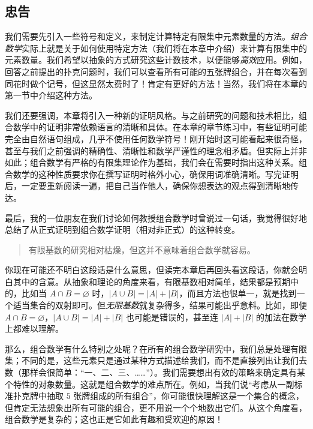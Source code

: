 
\subsection{忠告}

我们需要先引入一些符号和定义，来制定计算特定有限集中元素数量的方法。\emph{组合数学}实际上就是关于如何使用特定方法（我们将在本章中介绍）来计算有限集中的元素数量。我们希望以抽象的方式研究这些计数技术，以便能够\emph{高效}应用。例如，回答之前提出的扑克问题时，我们可以查看所有可能的五张牌组合，并在每次看到同花时做个记号，但这显然太费时了！肯定有更好的方法！当然，我们将在本章的第一节中介绍这种方法。

我们还要强调，本章将引入一种新的证明风格。与之前研究的问题和技术相比，组合数学中的证明非常依赖语言的清晰和具体。在本章的章节练习中，有些证明可能完全由自然语句组成，几乎不使用任何数学符号！刚开始时这可能看起来很奇怪，甚至与我们之前强调的精确性、清晰性和数学严谨性的理念相矛盾。但实际上并非如此；组合数学有严格的有限集理论作为基础，我们会在需要时指出这种关系。组合数学的这种性质要求你在撰写证明时格外小心，确保用词准确清晰。写完证明后，一定要重新阅读一遍，把自己当作他人，确保你想表达的观点得到清晰地传达。

最后，我的一位朋友在我们讨论如何教授组合数学时曾说过一句话，我觉得很好地总结了从正式证明到组合数学证明（相对非正式）的这种转变。
\begin{quotation}
    有限基数的研究相对枯燥，但这并不意味着组合数学就容易。
\end{quotation}
你现在可能还不明白这段话是什么意思，但读完本章后再回头看这段话，你就会明白其中的含意。从抽象和理论的角度来看，有限基数相对简单，结果都是预期中的，比如当 $A \cap B = \varnothing$ 时，$|A \cup B| = |A|+|B|$，而且方法也很单一，就是找到一个适当集合的双射即可。但\emph{无限基数}就复杂得多，结果可能出乎意料。比如，即便 $A \cap B = \varnothing$，$|A \cup B| = |A|+|B|$ 也可能是错误的，甚至连 $|A|+|B|$ 的加法在数学上都难以理解。

那么，组合数学有什么特别之处呢？在所有的组合数学研究中，我们总是处理有限集；不同的是，这些元素只是通过某种方式描述给我们，而不是直接列出让我们去数（那样会很简单：``一、二、三、……''）。我们需要想出有效的策略来确定具有某个特性的对象数量。这就是组合数学的难点所在。例如，当我们说``考虑从一副标准扑克牌中抽取 $5$ 张牌组成的所有组合''，你可能很快理解这是一个集合的概念，但肯定无法想象出所有可能的组合，更不用说一个个地数出它们。从这个角度看，组合数学是复杂的；这也正是它如此有趣和受欢迎的原因！
